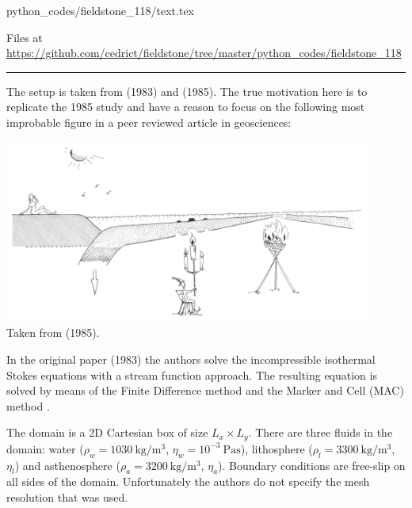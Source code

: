\begin{flushright} {\tiny {\color{gray} python\_codes/fieldstone\_118/text.tex}} \end{flushright}



\begin{center}
Files at \url{https://github.com/cedrict/fieldstone/tree/master/python_codes/fieldstone_118}
\end{center}

\par\noindent\rule{\textwidth}{0.4pt}


The setup is taken from \textcite{mato83} (1983) and \textcite{futo85} (1985).
The true motivation here is to replicate the 1985 study 
and have a reason to focus on the following most improbable figure in a peer reviewed
article in geosciences:

\begin{center}
\includegraphics[width=12cm]{./images/interesting/futo85}\\
{\captionfont Taken from \textcite{futo85} (1985).}
\end{center}

In the original paper (1983) the authors solve the incompressible isothermal Stokes equations
with a stream function approach. The resulting equation is solved by means of the
Finite Difference method and the Marker and Cell (MAC) method \cite{hawe65}.

The domain is a 2D Cartesian box of size $L_x \times L_y$. There are three fluids in the domain: 
water ($\rho_w=1030~\si{\kg\per\cubic\meter}$, $\eta_w=10^{-3}~\si{\pascal\second}$), 
lithosphere ($\rho_l=3300~\si{\kg\per\cubic\meter}$, $\eta_l$) and 
asthenosphere ($\rho_a=3200~\si{\kg\per\cubic\meter}$, $\eta_a$).
Boundary conditions are free-slip on all sides of the domain.
Unfortunately the authors do not specify the mesh resolution that was used. 


